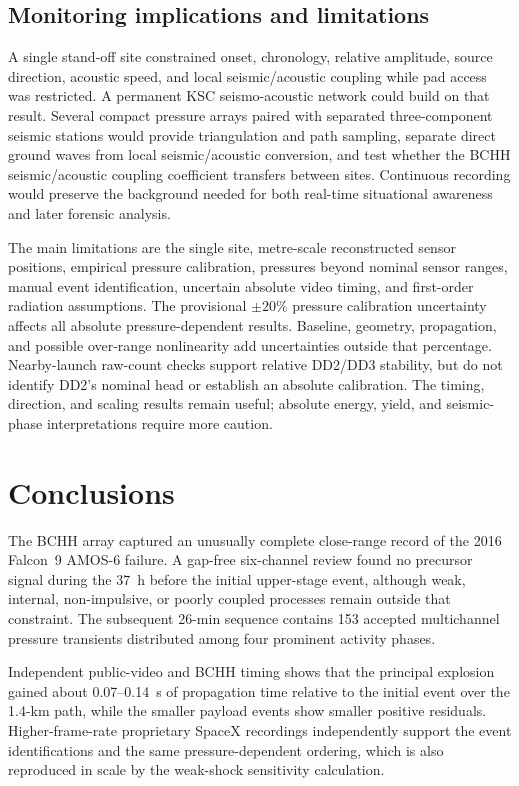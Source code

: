 \documentclass[]{seismica}
\begin{document}
\subsection{Monitoring implications and limitations}

A single stand-off site constrained onset, chronology, relative amplitude,
source direction, acoustic speed, and local seismic/acoustic coupling while pad
access was restricted. A permanent KSC seismo-acoustic network could build on
that result. Several compact pressure arrays paired with separated
three-component seismic stations would provide triangulation and path sampling,
separate direct ground waves from local seismic/acoustic conversion, and test
whether the BCHH seismic/acoustic coupling coefficient transfers between sites. Continuous
recording would preserve the background needed for both real-time situational
awareness and later forensic analysis.

The main limitations are the single site, metre-scale reconstructed sensor
positions, empirical pressure calibration, pressures beyond nominal sensor
ranges, manual event identification, uncertain absolute video timing, and
first-order radiation assumptions. The provisional $\pm20\%$ pressure
calibration uncertainty affects all absolute pressure-dependent results.
Baseline, geometry, propagation, and possible over-range nonlinearity add
uncertainties outside that percentage. Nearby-launch raw-count checks support
relative DD2/DD3 stability, but do not identify DD2's nominal head or establish
an absolute calibration. The timing, direction, and scaling results remain
useful; absolute energy, yield, and seismic-phase interpretations require more
caution.


\section{Conclusions}
\label{sec:conclusions}

The BCHH array captured an unusually complete close-range record of the 2016
Falcon~9 AMOS-6 failure. A gap-free six-channel review found no precursor
signal during the 37~h before the initial upper-stage event, although weak,
internal, non-impulsive, or poorly coupled processes remain outside that
constraint. The subsequent 26-min sequence contains 153 accepted multichannel
pressure transients distributed among four prominent activity phases.

Independent public-video and BCHH timing shows that the principal explosion
gained about 0.07--0.14~s of propagation time relative to the initial event
over the 1.4-km path, while the smaller payload events show smaller positive
residuals. Higher-frame-rate proprietary SpaceX recordings independently
support the event identifications and the same pressure-dependent ordering,
which is also reproduced in scale by the weak-shock sensitivity calculation.
\end{document}
